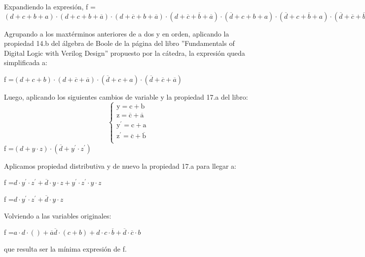\documentclass[../../informe/src/main.tex]{subfiles}
\begin{document}
	Expandiendo la expresión, f =$ (d+c+b+a)\cdot (d+c+b+\overline{a})\cdot (d+\overline{c}+b+\overline{a})
	\cdot (d+\overline{c}+\overline{b}+\overline{a})\cdot (\overline{d}+c+b+a)\cdot
	 (\overline{d}+c+\overline{b}+a)\cdot (\overline{d}+\overline{c}+\overline{b}+a)\cdot
	 (\overline{d}+\overline{c}+\overline{b}+\overline{a})$
	 \par
	 Agrupando a los maxtérminos anteriores de a dos y en orden, aplicando la propiedad 14.b del álgebra de Boole de la página del 			libro ''Fundamentals of Digital Logic with Verilog Design'' propuesto por la cátedra, la expresión queda simplificada a: \par
	 f =$ (d+c+b)\cdot (d+\overline{c}+\overline{a})\cdot (\overline{d}+c+a)\cdot (\overline{d}+\overline{c}+\overline{a})$\par
	Luego, aplicando los siguientes cambios de variable y la propiedad 17.a del libro:
	 	\begin{equation}
  	  \left\{
	  	\begin{array}{ll}
		 			\mathrm{y} = \mathrm{c + b} \\
			 		\mathrm{z} = \mathrm{\overline{c} + \overline{a}} \\
		 			\mathrm{y^{'}} = \mathrm{c + a} \\
			 		\mathrm{z^{'}} = \mathrm{\overline{c} + \overline{b}} \\			 		
	    \end{array}
	    \right.
 		\end{equation}
 	f =$ (d + y\cdot z)\cdot (\overline{d} + y^{'}\cdot z^{'})$ \par
	Aplicamos propiedad distributiva y de nuevo la propiedad 17.a para llegar a:
	\par
	f =$ d\cdot y^{'}\cdot z^{'} + \overline{d}\cdot y\cdot z + y^{'}\cdot z^{'}\cdot y\cdot z$
	\par
	f =$ d\cdot y^{'}\cdot z^{'} + \overline{d}\cdot y\cdot z$
	\par
	Volviendo a las variables originales: \par
	
	f =$ a\cdot d\cdot ()+ \overline{a}\overline{d}\cdot(c + b) + d\cdot c \cdot \overline{b} + 
	\overline{d}\cdot \overline{c} \cdot b$\par
	que resulta ser la mínima expresión de f.
	
	
	 
		  
	  
\end{document}
